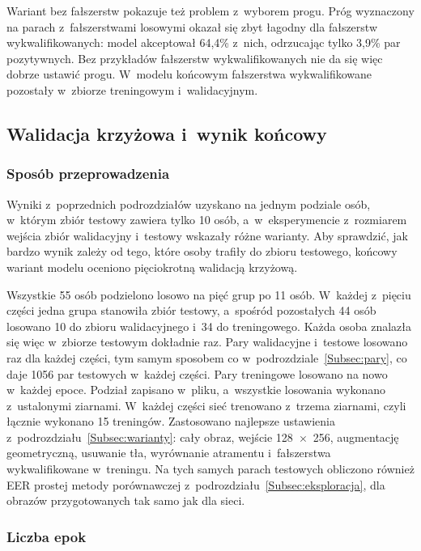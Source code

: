 \documentclass[12pt, twoside, openright]{article}
\begin{document}
Wariant bez fałszerstw pokazuje też problem z~wyborem progu.
Próg wyznaczony na parach z~fałszerstwami losowymi okazał się zbyt łagodny dla fałszerstw wykwalifikowanych: model akceptował 64,4\% z~nich, odrzucając tylko 3,9\% par pozytywnych.
Bez przykładów fałszerstw wykwalifikowanych nie da się więc dobrze ustawić progu.
W~modelu końcowym fałszerstwa wykwalifikowane pozostały w~zbiorze treningowym i~walidacyjnym.

\subsection{Walidacja krzyżowa i~wynik końcowy}
\label{Subsec:cv}

\subsubsection*{Sposób przeprowadzenia}

Wyniki z~poprzednich podrozdziałów uzyskano na jednym podziale osób, w~którym zbiór testowy zawiera tylko 10 osób, a~w~eksperymencie z~rozmiarem wejścia zbiór walidacyjny i~testowy wskazały różne warianty.
Aby sprawdzić, jak bardzo wynik zależy od tego, które osoby trafiły do zbioru testowego, końcowy wariant modelu oceniono pięciokrotną walidacją krzyżową.

Wszystkie 55 osób podzielono losowo na pięć grup po 11 osób.
W~każdej z~pięciu części jedna grupa stanowiła zbiór testowy, a~spośród pozostałych 44 osób losowano 10 do zbioru walidacyjnego i~34 do treningowego.
Każda osoba znalazła się więc w~zbiorze testowym dokładnie raz.
Pary walidacyjne i~testowe losowano raz dla każdej części, tym samym sposobem co w~podrozdziale~\ref{Subsec:pary}, co daje 1056 par testowych w~każdej części.
Pary treningowe losowano na nowo w~każdej epoce.
Podział zapisano w~pliku, a~wszystkie losowania wykonano z~ustalonymi ziarnami.
W~każdej części sieć trenowano z~trzema ziarnami, czyli łącznie wykonano 15 treningów.
Zastosowano najlepsze ustawienia z~podrozdziału~\ref{Subsec:warianty}: cały obraz, wejście 128~$\times$~256, augmentację geometryczną, usuwanie tła, wyrównanie atramentu i~fałszerstwa wykwalifikowane w~treningu.
Na tych samych parach testowych obliczono również EER prostej metody porównawczej z~podrozdziału~\ref{Subsec:eksploracja}, dla obrazów przygotowanych tak samo jak dla sieci.

\subsubsection*{Liczba epok}
\end{document}
